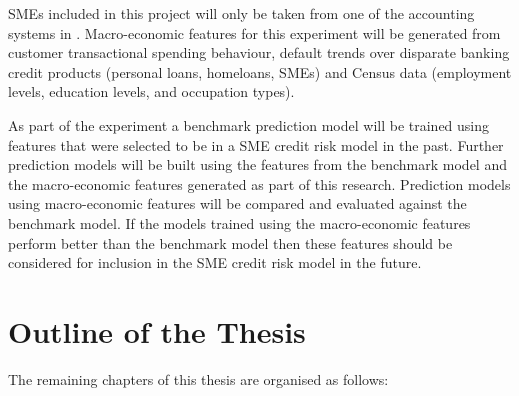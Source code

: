 SMEs included in this project will only be taken from one of the accounting systems in \subjectname. Macro-economic features for this experiment will be generated from customer transactional spending behaviour, default trends over disparate banking credit products (personal loans, homeloans, SMEs) and Census data (employment levels, education levels, and occupation types).

As part of the experiment a benchmark prediction model will be trained using features that were selected to be in a SME credit risk model in the past. Further prediction models will be built using the features from the benchmark model and the macro-economic features generated as part of this research. Prediction models using macro-economic features will be compared and evaluated against the benchmark model. If the models trained using the  macro-economic features perform better than the benchmark model then these features should be considered for inclusion in the SME credit risk model in the future. 



\section{Outline of the Thesis}
The remaining chapters of this thesis are organised as follows:


